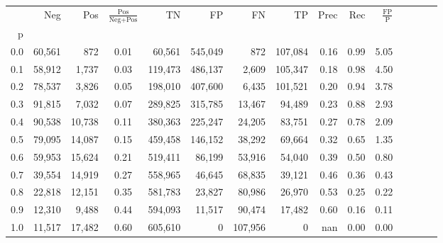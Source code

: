\begin{tabular}{rrrcrrrrrrrrrrr}
\toprule
{} &     Neg &     Pos & $\frac{\text{Pos}}{\text{Neg}+\text{Pos}}$ &       TN &       FP &       FN &       TP &  Prec &   Rec & $\frac{\text{FP}}{\text{P}}$ \\
p   &         &         &                                            &          &          &          &          &       &       &                              \\
\midrule
0.0 &  60,561 &     872 &                                       0.01 &   60,561 &  545,049 &      872 &  107,084 &  0.16 &  0.99 &                         5.05 \\
0.1 &  58,912 &   1,737 &                                       0.03 &  119,473 &  486,137 &    2,609 &  105,347 &  0.18 &  0.98 &                         4.50 \\
0.2 &  78,537 &   3,826 &                                       0.05 &  198,010 &  407,600 &    6,435 &  101,521 &  0.20 &  0.94 &                         3.78 \\
0.3 &  91,815 &   7,032 &                                       0.07 &  289,825 &  315,785 &   13,467 &   94,489 &  0.23 &  0.88 &                         2.93 \\
0.4 &  90,538 &  10,738 &                                       0.11 &  380,363 &  225,247 &   24,205 &   83,751 &  0.27 &  0.78 &                         2.09 \\
0.5 &  79,095 &  14,087 &                                       0.15 &  459,458 &  146,152 &   38,292 &   69,664 &  0.32 &  0.65 &                         1.35 \\
0.6 &  59,953 &  15,624 &                                       0.21 &  519,411 &   86,199 &   53,916 &   54,040 &  0.39 &  0.50 &                         0.80 \\
0.7 &  39,554 &  14,919 &                                       0.27 &  558,965 &   46,645 &   68,835 &   39,121 &  0.46 &  0.36 &                         0.43 \\
0.8 &  22,818 &  12,151 &                                       0.35 &  581,783 &   23,827 &   80,986 &   26,970 &  0.53 &  0.25 &                         0.22 \\
0.9 &  12,310 &   9,488 &                                       0.44 &  594,093 &   11,517 &   90,474 &   17,482 &  0.60 &  0.16 &                         0.11 \\
1.0 &  11,517 &  17,482 &                                       0.60 &  605,610 &        0 &  107,956 &        0 &   nan &  0.00 &                         0.00 \\
\bottomrule
\end{tabular}
